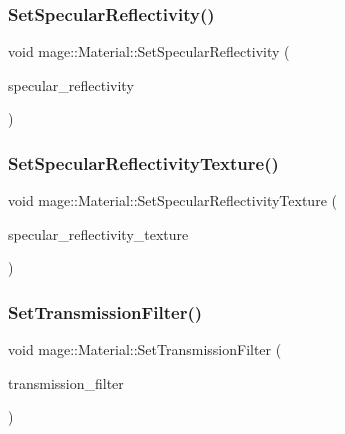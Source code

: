 \subsubsection{\texorpdfstring{Set\+Specular\+Reflectivity()}{SetSpecularReflectivity()}\hspace{0.1cm}{\footnotesize\ttfamily [2/2]}}
{\footnotesize\ttfamily void mage\+::\+Material\+::\+Set\+Specular\+Reflectivity (\begin{DoxyParamCaption}\item[{\hyperlink{structmage_1_1_r_g_b_spectrum}{R\+G\+B\+Spectrum} \&\&}]{specular\+\_\+reflectivity }\end{DoxyParamCaption})\hspace{0.3cm}{\ttfamily [noexcept]}}

\hypertarget{structmage_1_1_material_a130430244dfd0b5866b00fca523e874c}{}\label{structmage_1_1_material_a130430244dfd0b5866b00fca523e874c} 
\subsubsection{\texorpdfstring{Set\+Specular\+Reflectivity\+Texture()}{SetSpecularReflectivityTexture()}}
{\footnotesize\ttfamily void mage\+::\+Material\+::\+Set\+Specular\+Reflectivity\+Texture (\begin{DoxyParamCaption}\item[{\hyperlink{namespacemage_a1e01ae66713838a7a67d30e44c67703e}{Shared\+Ptr}$<$ \hyperlink{classmage_1_1_texture}{Texture} $>$}]{specular\+\_\+reflectivity\+\_\+texture }\end{DoxyParamCaption})}

\hypertarget{structmage_1_1_material_afe8121e13eb9fff9ffb281e7c807f2e0}{}\label{structmage_1_1_material_afe8121e13eb9fff9ffb281e7c807f2e0} 
\subsubsection{\texorpdfstring{Set\+Transmission\+Filter()}{SetTransmissionFilter()}\hspace{0.1cm}{\footnotesize\ttfamily [1/2]}}
{\footnotesize\ttfamily void mage\+::\+Material\+::\+Set\+Transmission\+Filter (\begin{DoxyParamCaption}\item[{const \hyperlink{structmage_1_1_r_g_b_spectrum}{R\+G\+B\+Spectrum} \&}]{transmission\+\_\+filter }\end{DoxyParamCaption})\hspace{0.3cm}{\ttfamily [noexcept]}}

